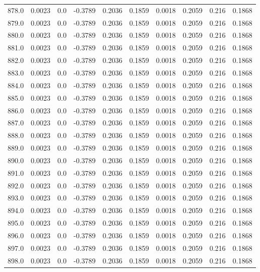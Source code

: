 \begin{longtable}{lrrrrrrrrr}
878.0 & 0.0023 & 0.0 & -0.3789 & 0.2036 & 0.1859 & 0.0018 & 0.2059 & 0.216 & 0.1868 \\
879.0 & 0.0023 & 0.0 & -0.3789 & 0.2036 & 0.1859 & 0.0018 & 0.2059 & 0.216 & 0.1868 \\
880.0 & 0.0023 & 0.0 & -0.3789 & 0.2036 & 0.1859 & 0.0018 & 0.2059 & 0.216 & 0.1868 \\
881.0 & 0.0023 & 0.0 & -0.3789 & 0.2036 & 0.1859 & 0.0018 & 0.2059 & 0.216 & 0.1868 \\
882.0 & 0.0023 & 0.0 & -0.3789 & 0.2036 & 0.1859 & 0.0018 & 0.2059 & 0.216 & 0.1868 \\
883.0 & 0.0023 & 0.0 & -0.3789 & 0.2036 & 0.1859 & 0.0018 & 0.2059 & 0.216 & 0.1868 \\
884.0 & 0.0023 & 0.0 & -0.3789 & 0.2036 & 0.1859 & 0.0018 & 0.2059 & 0.216 & 0.1868 \\
885.0 & 0.0023 & 0.0 & -0.3789 & 0.2036 & 0.1859 & 0.0018 & 0.2059 & 0.216 & 0.1868 \\
886.0 & 0.0023 & 0.0 & -0.3789 & 0.2036 & 0.1859 & 0.0018 & 0.2059 & 0.216 & 0.1868 \\
887.0 & 0.0023 & 0.0 & -0.3789 & 0.2036 & 0.1859 & 0.0018 & 0.2059 & 0.216 & 0.1868 \\
888.0 & 0.0023 & 0.0 & -0.3789 & 0.2036 & 0.1859 & 0.0018 & 0.2059 & 0.216 & 0.1868 \\
889.0 & 0.0023 & 0.0 & -0.3789 & 0.2036 & 0.1859 & 0.0018 & 0.2059 & 0.216 & 0.1868 \\
890.0 & 0.0023 & 0.0 & -0.3789 & 0.2036 & 0.1859 & 0.0018 & 0.2059 & 0.216 & 0.1868 \\
891.0 & 0.0023 & 0.0 & -0.3789 & 0.2036 & 0.1859 & 0.0018 & 0.2059 & 0.216 & 0.1868 \\
892.0 & 0.0023 & 0.0 & -0.3789 & 0.2036 & 0.1859 & 0.0018 & 0.2059 & 0.216 & 0.1868 \\
893.0 & 0.0023 & 0.0 & -0.3789 & 0.2036 & 0.1859 & 0.0018 & 0.2059 & 0.216 & 0.1868 \\
894.0 & 0.0023 & 0.0 & -0.3789 & 0.2036 & 0.1859 & 0.0018 & 0.2059 & 0.216 & 0.1868 \\
895.0 & 0.0023 & 0.0 & -0.3789 & 0.2036 & 0.1859 & 0.0018 & 0.2059 & 0.216 & 0.1868 \\
896.0 & 0.0023 & 0.0 & -0.3789 & 0.2036 & 0.1859 & 0.0018 & 0.2059 & 0.216 & 0.1868 \\
897.0 & 0.0023 & 0.0 & -0.3789 & 0.2036 & 0.1859 & 0.0018 & 0.2059 & 0.216 & 0.1868 \\
898.0 & 0.0023 & 0.0 & -0.3789 & 0.2036 & 0.1859 & 0.0018 & 0.2059 & 0.216 & 0.1868 \\

\end{longtable}
